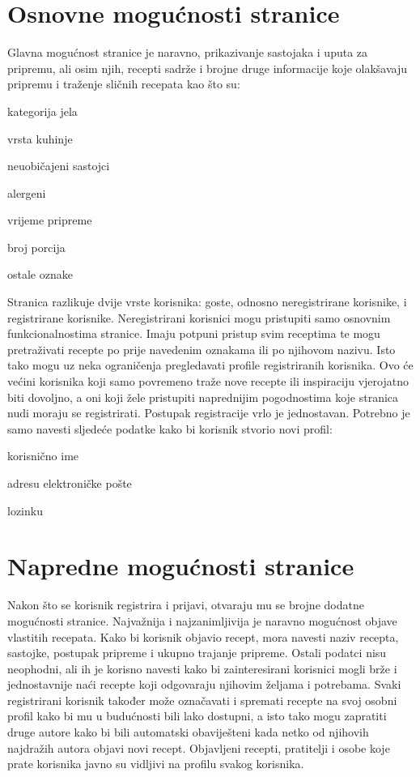 		\section{Osnovne mogućnosti stranice}
		Glavna mogućnost stranice je naravno, prikazivanje sastojaka i uputa za pripremu, ali osim njih, recepti sadrže i brojne druge informacije koje olakšavaju pripremu i traženje sličnih recepata kao što su:
		\begin{packed_item}
			\item kategorija jela
			\item vrsta kuhinje
			\item neuobičajeni sastojci
			\item alergeni
			\item vrijeme pripreme
			\item broj porcija
			\item ostale oznake
		\end{packed_item}
		Stranica razlikuje dvije vrste korisnika: goste, odnosno neregistrirane korisnike, i registrirane korisnike. Neregistrirani korisnici mogu pristupiti samo osnovnim funkcionalnostima stranice. Imaju potpuni pristup svim receptima te mogu pretraživati recepte po prije navedenim oznakama ili po njihovom nazivu. Isto tako mogu uz neka ograničenja pregledavati profile registriranih korisnika. Ovo će većini korisnika koji samo povremeno traže nove recepte ili inspiraciju vjerojatno biti dovoljno, a oni koji žele pristupiti naprednijim pogodnostima koje stranica nudi moraju se registrirati.
		\linebreak
		Postupak registracije vrlo je jednostavan. Potrebno je samo navesti sljedeće podatke kako bi korisnik stvorio novi profil:
		\begin{packed_item}
			\item korisnično ime
			\item adresu elektroničke pošte
			\item lozinku
		\end{packed_item}
		\pagebreak
		\section{Napredne mogućnosti stranice}
		Nakon što se korisnik registrira i prijavi, otvaraju mu se brojne dodatne mogućnosti stranice. Najvažnija i najzanimljivija je naravno mogućnost objave vlastitih recepata. Kako bi korisnik objavio recept, mora navesti naziv recepta, sastojke, postupak pripreme i ukupno trajanje pripreme. Ostali podatci nisu neophodni, ali ih je korisno navesti kako bi zainteresirani korisnici mogli brže i jednostavnije naći recepte koji odgovaraju njihovim željama i potrebama.
		\linebreak
		\linebreak
		Svaki registrirani korisnik također može označavati i spremati recepte na svoj osobni profil kako bi mu u budućnosti bili lako dostupni, a isto tako mogu zapratiti druge autore kako bi bili automatski obaviješteni kada netko od njihovih najdražih autora objavi novi recept.
		Objavljeni recepti, pratitelji i osobe koje prate korisnika javno su vidljivi na profilu svakog korisnika.
